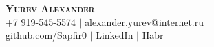 \documentclass[A4,11pt]{article}
\begin{document}
\begin{comment}
In Europe it is common to include a picture of ones self in the CV. Select
which heading appropriate for the document you are creating.
\end{comment}


\begin{center}
   \textbf{\Huge \scshape Yurev Alexander} \\ \vspace{1pt} %
   \small +7 919-545-5574 $|$ 
   \href{mailto:alexander.yurev@internet.ru}{\underline{alexander.yurev@internet.ru}} $|$\\
   \href{https://github.com/Sapfir0}{\underline{github.com/Sapfir0}} $|$
   \href{https://linkedin.com/in/yurevalexander}{\underline{LinkedIn}} $|$
   \href{https://habr.com/ru/users/alexanderyurev/}{\underline{Habr}}
\end{center}



\begin{comment}
This CV was written for specifically for positions I was applying for in
academia, and then modified to be a template.

A standard CV is about two pages long where as a resume in the US is one page.
sections can be added and removed here with this in mind. In my experience, 
education, and applicable work experience and skills are the most import things
to include on a resume. For a CV the Europass CV suggests the categories: Work
Experience, Education and Training, Language Skills, Digital Skills,
Communication and Interpersonal Skills, Conferences and Seminars, Creative Works
Driver's License, Hobbies and Interests, Honors and Awards, Management and
Leadership Skills, Networks and Memberships, Organizational Skills, Projects,
Publications, Recommendations, Social and Political Activities, Volunteering.

Your goal is to convey a who, what , when, where, why for every item you share. 
The who is obviously you, but I believe the rest should be done in that order.
For example below. An employer cares most about the degree held and typically 
less about the institution or where it is located (This is still good 
information though). Whatever order you choose be consistent throughout.
\end{comment}
\end{document}
